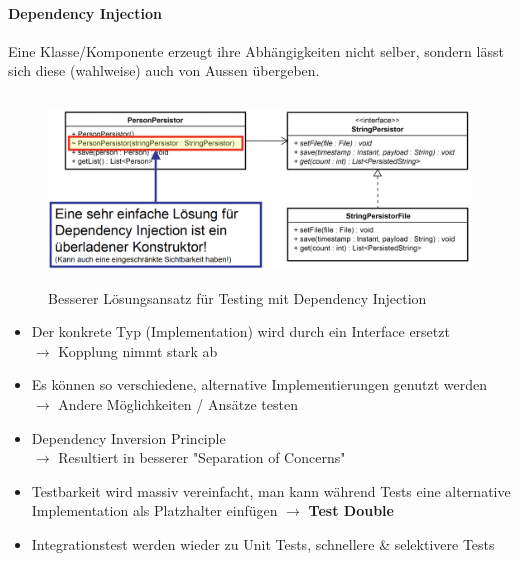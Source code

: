 \documentclass[a4paper]{article}
\begin{document}
		\newpage
		
				\paragraph{Dependency Injection}
				
				Eine Klasse/Komponente erzeugt ihre Abhängigkeiten nicht selber, sondern lässt sich diese (wahlweise) auch von Aussen übergeben.
				
				\begin{figure}[!htb]
					\centering
					\includegraphics[keepaspectratio, height=5cm]{img/testing/di_02.png}
					\caption{Besserer Lösungsansatz für Testing mit Dependency Injection}
					\label{fig:di_02}
				\end{figure}
			
				\begin{itemize}
					\item Der konkrete Typ (Implementation) wird durch ein Interface ersetzt\\
					$\rightarrow$ Kopplung nimmt stark ab
					
					\item Es können so verschiedene, alternative Implementierungen genutzt werden\\
					$\rightarrow$ Andere Möglichkeiten / Ansätze testen
					
					\item Dependency Inversion Principle\\
					$\rightarrow$ Resultiert in besserer "Separation of Concerns"
					
					\item Testbarkeit wird massiv vereinfacht, man kann während Tests eine alternative Implementation als Platzhalter einfügen $\rightarrow$ \textbf{Test Double}
					
					\item Integrationstest werden wieder zu Unit Tests, schnellere \& selektivere Tests
				\end{itemize}
		
\end{document}
